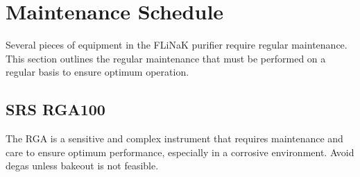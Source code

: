 %
%

\section{Maintenance Schedule}
Several pieces of equipment in the FLiNaK purifier require regular maintenance.
This section outlines the regular maintenance that must be performed
on a regular basis to ensure optimum operation.

\subsection{SRS RGA100}

The RGA is a sensitive and complex instrument that requires
maintenance and care to ensure optimum performance, especially in
a corrosive environment. Avoid degas unless bakeout is not
feasible.

